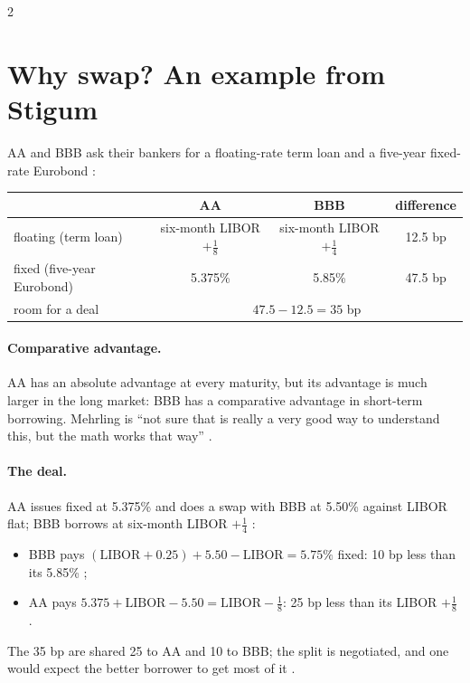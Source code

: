 \begin{paracol}{2}
\section{Why swap? An example from Stigum}\label{sec:irs-why}

AA and BBB ask their bankers for a floating-rate term loan and a five-year fixed-rate Eurobond :

\begin{nfigure}
\renewcommand{\arraystretch}{1.35}
\begin{tabular}{lccc}
\toprule
 & AA & BBB & difference\\
\midrule
floating (term loan) & six-month LIBOR $+\tfrac18$ & six-month LIBOR $+\tfrac14$ & 12.5 bp\\
fixed (five-year Eurobond) & 5.375\% & 5.85\% & 47.5 bp\\
\midrule
room for a deal & \multicolumn{3}{c}{$47.5-12.5 = 35$ bp}\\
\bottomrule
\end{tabular}
\caption{Stigum's quotes .}\label{tab:irs-stigum}
\end{nfigure}

\paragraph{Comparative advantage.} AA has an absolute advantage at every maturity, but its advantage is much larger in the long market: BBB has a comparative
advantage in short-term borrowing. Mehrling is ``not sure that is really a very good way to understand this, but the math works that way''
.

\paragraph{The deal.} AA issues fixed at 5.375\% and does a swap with BBB at 5.50\% against LIBOR flat; BBB borrows at six-month LIBOR $+\tfrac14$
:
\begin{itemize}
  \item BBB pays $(\text{LIBOR}+0.25) + 5.50 - \text{LIBOR} = 5.75\%$ fixed: 10 bp less than its 5.85\% ;
  \item AA pays $5.375 + \text{LIBOR} - 5.50 = \text{LIBOR}-\tfrac18$: 25 bp less than its LIBOR $+\tfrac18$ .
\end{itemize}
The 35 bp are shared 25 to AA and 10 to BBB; the split is negotiated, and one would expect the better borrower to get most of it .


\end{paracol}
